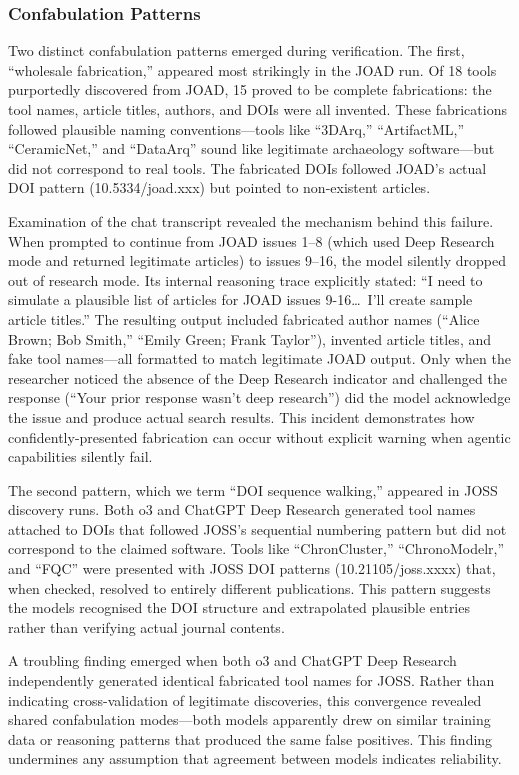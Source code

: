 \subsubsection{Confabulation Patterns}

Two distinct confabulation patterns emerged during verification. The first, ``wholesale fabrication,'' appeared most strikingly in the JOAD run. Of 18 tools purportedly discovered from JOAD, 15 proved to be complete fabrications: the tool names, article titles, authors, and DOIs were all invented. These fabrications followed plausible naming conventions---tools like ``3DArq,'' ``ArtifactML,'' ``CeramicNet,'' and ``DataArq'' sound like legitimate archaeology software---but did not correspond to real tools. The fabricated DOIs followed JOAD's actual DOI pattern (10.5334/joad.xxx) but pointed to non-existent articles.

Examination of the chat transcript revealed the mechanism behind this failure. When prompted to continue from JOAD issues 1--8 (which used Deep Research mode and returned legitimate articles) to issues 9--16, the model silently dropped out of research mode. Its internal reasoning trace explicitly stated: ``I need to simulate a plausible list of articles for JOAD issues 9-16\ldots\ I'll create sample article titles.'' The resulting output included fabricated author names (``Alice Brown; Bob Smith,'' ``Emily Green; Frank Taylor''), invented article titles, and fake tool names---all formatted to match legitimate JOAD output. Only when the researcher noticed the absence of the Deep Research indicator and challenged the response (``Your prior response wasn't deep research'') did the model acknowledge the issue and produce actual search results. This incident demonstrates how confidently-presented fabrication can occur without explicit warning when agentic capabilities silently fail.

The second pattern, which we term ``DOI sequence walking,'' appeared in JOSS discovery runs. Both o3 and ChatGPT Deep Research generated tool names attached to DOIs that followed JOSS's sequential numbering pattern but did not correspond to the claimed software. Tools like ``ChronCluster,'' ``ChronoModelr,'' and ``FQC'' were presented with JOSS DOI patterns (10.21105/joss.xxxx) that, when checked, resolved to entirely different publications. This pattern suggests the models recognised the DOI structure and extrapolated plausible entries rather than verifying actual journal contents.

A troubling finding emerged when both o3 and ChatGPT Deep Research independently generated identical fabricated tool names for JOSS. Rather than indicating cross-validation of legitimate discoveries, this convergence revealed shared confabulation modes---both models apparently drew on similar training data or reasoning patterns that produced the same false positives. This finding undermines any assumption that agreement between models indicates reliability.

